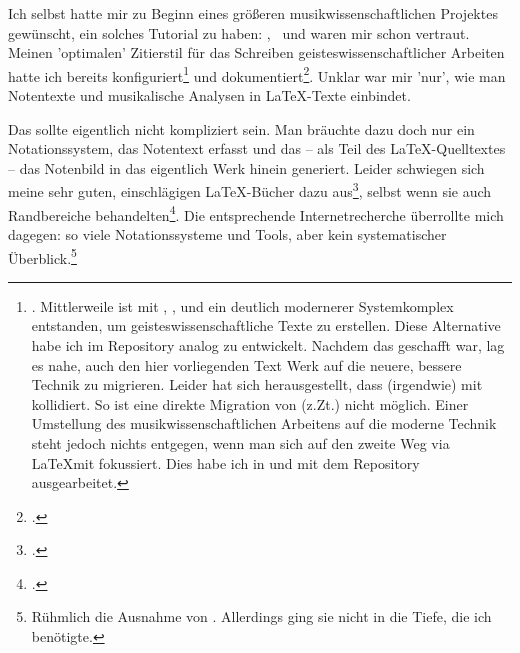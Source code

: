 

%
%

Ich selbst hatte mir zu Beginn eines größeren musikwissenschaftlichen Projektes gewünscht, ein solches Tutorial zu haben: \acc{\LaTeX}, \ und  waren mir schon vertraut. Meinen 'optimalen' Zitierstil für das Schreiben geisteswissenschaftlicher Arbeiten hatte ich bereits konfiguriert\footnote{\cite[vgl.][\nopage wp]{Reincke2018a}. Mittlerweile ist mit \acc{\LaTeX}, ,  und  ein deutlich modernerer Systemkomplex entstanden, um geisteswissenschaftliche Texte zu erstellen. Diese Alternative habe ich im Repository  analog zu  entwickelt. Nachdem das geschafft war, lag es nahe, auch den hier vorliegenden Text  Werk auf die neuere, bessere Technik zu migrieren. Leider hat sich herausgestellt, dass  (irgendwie) mit  kollidiert. So ist eine direkte Migration von  (z.Zt.) nicht möglich. Einer Umstellung des musikwissenschaftlichen Arbeitens  auf die moderne Technik steht jedoch nichts entgegen, wenn man sich auf den zweite Weg via \LaTeX mit  fokussiert. Dies habe ich in und mit dem Repository  ausgearbeitet.} und dokumentiert\footnote{\cite[vgl][2ff]{Reincke2018b}.}. Unklar war mir 'nur', wie man Notentexte und musikalische Analysen in \LaTeX-Texte einbindet.

Das sollte eigentlich nicht kompliziert sein. Man bräuchte dazu doch nur ein No\-ta\-tions\-system, das Notentext erfasst und das -- als Teil des \LaTeX-Quelltextes -- das Notenbild in das eigentlich Werk hinein generiert. Leider schwiegen sich meine sehr guten, einschlägigen \LaTeX-Bücher dazu aus\footcite[vgl.][vi ff, insbesondere 905 u. 909: das umfangreiche Register erwähnt weder Musik im allgemeinen noch LilyPond oder MusiX\TeX\ im Besonderen]{Voss2012a}, selbst wenn sie auch Randbereiche behandelten\footcite[vgl.][vii ff, insbesondere 1080 u. 1087: auch dieses umfangreiche Register erwähnt weder Musik im allgemeinen noch LilyPond oder MusiX\TeX\ im Besonderen.]{MitGoo2005a}. Die entsprechende Internetrecherche überrollte mich dagegen: so viele Notationssysteme und Tools, aber kein systematischer Überblick.\footnote{Rühmlich die Ausnahme von \cite[][\nopage wp.]{Thoma2018a}. Allerdings ging sie nicht in die Tiefe, die ich benötigte.}

